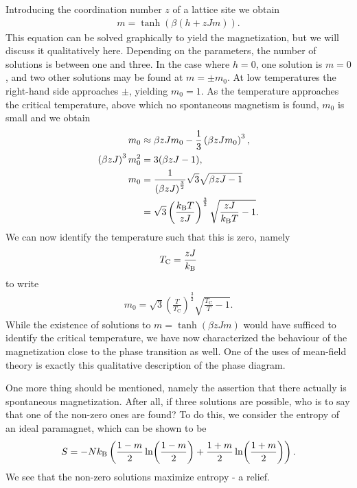 Introducing the coordination number $z$ of a lattice site we obtain
\begin{align*}
m = \tanh(\beta\left(h + zJm\right)).
\end{align*}
This equation can be solved graphically to yield the magnetization, but we will discuss it qualitatively here. Depending on the parameters, the number of solutions is between one and three. In the case where $h = 0$, one solution is $m = 0$, and two other solutions may be found at $m = \pm m_{0}$. At low temperatures the right-hand side approaches $\pm$, yielding $m_{0} = 1$. As the temperature approaches the critical temperature, above which no spontaneous magnetism is found, $m_{0}$ is small and we obtain
\begin{align*}
	m_{0}                              &\approx \beta zJm_{0} - \frac{1}{3}\left(\beta zJm_{0}\right)^{3}, \\
	\left(\beta zJ\right)^{3}m_{0}^{2} &= 3(\beta zJ - 1), \\
	m_{0}                              &= \frac{1}{\left(\beta zJ\right)^{\frac{3}{2}}}\sqrt{3}\sqrt{\beta zJ - 1} \\
	                                   &= \sqrt{3}\left(\frac{k_{\text{B}} T}{zJ}\right)^{\frac{3}{2}}\sqrt{\frac{zJ}{k_{\text{B}} T} - 1}.
\end{align*}
We can now identify the temperature such that this is zero, namely
\begin{align*}
	T_{\text{C}} = \frac{zJ}{k_{\text{B}}}
\end{align*}
to write
\begin{align*}
	m_{0} = \sqrt{3}\left(\frac{T}{T_{\text{C}}}\right)^{\frac{3}{2}}\sqrt{\frac{T_{\text{C}}}{T} - 1}.
\end{align*}
While the existence of solutions to $m = \tanh(\beta zJm)$ would have sufficed to identify the critical temperature, we have now characterized the behaviour of the magnetization close to the phase transition as well. One of the uses of mean-field theory is exactly this qualitative description of the phase diagram.

One more thing should be mentioned, namely the assertion that there actually is spontaneous magnetization. After all, if three solutions are possible, who is to say that one of the non-zero ones are found? To do this, we consider the entropy of an ideal paramagnet, which can be shown to be
\begin{align*}
S = -Nk_{\text{B}}\left(\frac{1 - m}{2}\ln(\frac{1 - m}{2}) + \frac{1 + m}{2}\ln(\frac{1 + m}{2})\right).
\end{align*}
We see that the non-zero solutions maximize entropy - a relief.

